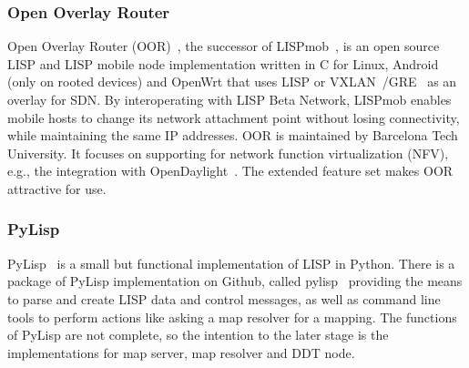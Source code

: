 \subsubsection{Open Overlay Router}
\label{subsubsec:implementation_oor}
Open Overlay Router (OOR)~\cite{OOR}, the successor of LISPmob~\cite{cabellos2011lispmob}, is an open source LISP and LISP mobile node implementation written in C for Linux, Android (only on rooted devices) and OpenWrt that uses LISP or VXLAN~\cite{mahalingam2014virtual}/GRE~\cite{hanks2000generic} as an overlay for SDN. %
By interoperating with LISP Beta Network, LISPmob enables mobile hosts to change its network attachment point without losing connectivity, while maintaining the same IP addresses. OOR is maintained by Barcelona Tech University. It focuses on supporting for network function virtualization (NFV), e.g., %
the integration with OpenDaylight~\cite{OpenDaylight}. The extended feature set makes OOR attractive for use.



\subsubsection{PyLisp}
\label{subsubsec:implementation_pylisp}
PyLisp~\cite{pylisp} is a small but functional implementation of LISP in Python. There is a package of PyLisp implementation on Github, called pylisp~\cite{pylispgithub} providing the means to parse and create LISP data and control messages, as well as command line tools to perform actions like asking a map resolver for a mapping. The functions of PyLisp are not complete, so the intention to the later stage is the implementations for map server, map resolver and DDT node.


